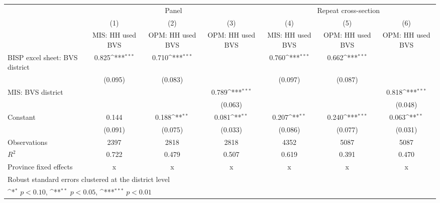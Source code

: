 {
\def\sym#1{\ifmmode^{#1}\else\(^{#1}\)\fi}
\begin{tabular}{l*{6}{c}}
\hline\hline
                    &\multicolumn{3}{c}{Panel}                                        &\multicolumn{3}{c}{Repeat cross-section}                         \\\cmidrule(lr){2-4}\cmidrule(lr){5-7}
                    &\multicolumn{1}{c}{(1)}&\multicolumn{1}{c}{(2)}&\multicolumn{1}{c}{(3)}&\multicolumn{1}{c}{(4)}&\multicolumn{1}{c}{(5)}&\multicolumn{1}{c}{(6)}\\
                    &\multicolumn{1}{c}{MIS: HH used BVS}&\multicolumn{1}{c}{OPM: HH used BVS}&\multicolumn{1}{c}{OPM: HH used BVS}&\multicolumn{1}{c}{MIS: HH used BVS}&\multicolumn{1}{c}{OPM: HH used BVS}&\multicolumn{1}{c}{OPM: HH used BVS}\\
\hline
BISP excel sheet: BVS district&       0.825\sym{***}&       0.710\sym{***}&                     &       0.760\sym{***}&       0.662\sym{***}&                     \\
                    &     (0.095)         &     (0.083)         &                     &     (0.097)         &     (0.087)         &                     \\
[1em]
MIS: BVS district   &                     &                     &       0.789\sym{***}&                     &                     &       0.818\sym{***}\\
                    &                     &                     &     (0.063)         &                     &                     &     (0.048)         \\
[1em]
Constant            &       0.144         &       0.188\sym{**} &       0.081\sym{**} &       0.207\sym{**} &       0.240\sym{***}&       0.063\sym{**} \\
                    &     (0.091)         &     (0.075)         &     (0.033)         &     (0.086)         &     (0.077)         &     (0.031)         \\
\hline
Observations        &        2397         &        2818         &        2818         &        4352         &        5087         &        5087         \\
\(R^{2}\)           &       0.722         &       0.479         &       0.507         &       0.619         &       0.391         &       0.470         \\
Province fixed effects&           x         &           x         &           x         &           x         &           x         &           x         \\
\hline\hline
\multicolumn{7}{l}{\footnotesize Robust standard errors clustered at the district level}\\
\multicolumn{7}{l}{\footnotesize \sym{*} \(p<0.10\), \sym{**} \(p<0.05\), \sym{***} \(p<0.01\)}\\
\end{tabular}
}
